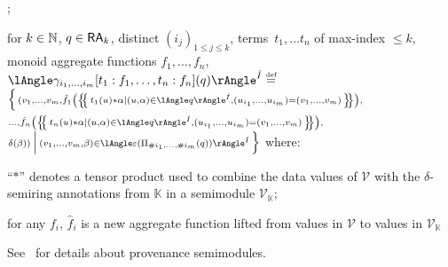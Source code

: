 \begin{compactdesc}
	\hspace*{-2em}	
	;
	\)
	\item[aggregation] for $k\in\mathbb{N}$,
	$q\in\mathsf{RA}_k$, distinct $(i_j)_{1\leq j\leq k}$,
	terms~$t_1,\dots t_n$
	of max-index $\leq k$, monoid aggregate functions
	$f_1,\dots,f_n$,\\
	\(
	\ansem{\hat I}{\gamma_{i_1,\dots,i_m}
		[t_1:f_1,\dots,t_n:f_n](q)}\defeq\)\\\(\scriptstyle
	\Big\{\,
	(v_1,\dots,v_m,
	\hat
	f_1\left(\mset{t_1(u)*\alpha\mid
	(u,\alpha)\in
	\ansem{\hat
		I}{q},
	(u_{i_1},\dots,u_{i_m})=(v_1,\dots,v_m)}\right),\)\\\(\scriptstyle
	\dots,
	\hat f_n\left(\mset{t_n(u)*\alpha\mid
	(u,\alpha)\in
	\ansem{\hat
		I}{q},
	(u_{i_1},\dots,u_{i_m})=(v_1,\dots,v_m)}\right),
	\)\\\(\scriptstyle
	\delta(\beta))
	\:\Big|\:
	(v_1,\dots,v_m,\beta)\in\ansem{\hat I}{\epsilon(\Pi_{\#i_1,\dots,\#i_m}(q))}
	\,\Big\}\)
	where:
	\begin{compactitem}
		\item ``$*$'' denotes a tensor
		product used to combine the data values of $\mathcal{V}$ with the
		$\delta$-semiring annotations from $\mathbb{K}$ in a semimodule
		$\mathcal{V}_{\mathbb{K}}$;
		\item
		for any $f_i$, $\hat f_i$ is a new aggregate function lifted from
		values in $\mathcal{V}$ to values in $\mathcal{V}_\mathbb{K}$
	\end{compactitem}
	See~\cite{amsterdamer2011provenance} for
	details about provenance semimodules.
\end{compactdesc}

